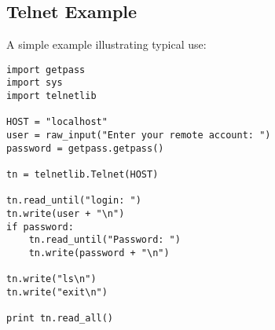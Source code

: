 \subsection{Telnet Example \label{telnet-example}}

A simple example illustrating typical use:

\begin{verbatim}
import getpass
import sys
import telnetlib

HOST = "localhost"
user = raw_input("Enter your remote account: ")
password = getpass.getpass()

tn = telnetlib.Telnet(HOST)

tn.read_until("login: ")
tn.write(user + "\n")
if password:
    tn.read_until("Password: ")
    tn.write(password + "\n")

tn.write("ls\n")
tn.write("exit\n")

print tn.read_all()
\end{verbatim}
